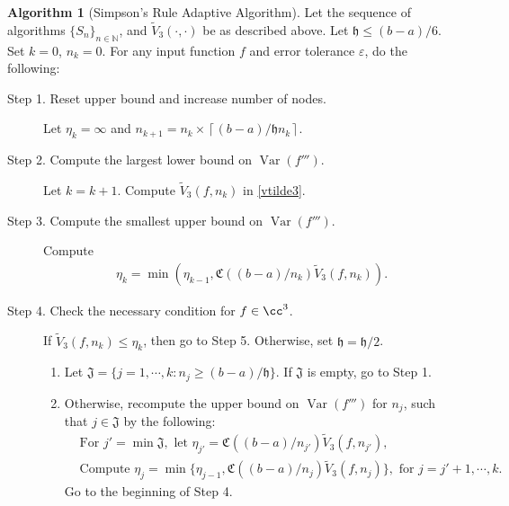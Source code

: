 \documentclass{iitthesis}
\DeclareMathOperator{\Var}{Var}
\theoremstyle{definition}
\newtheorem{algo}{Algorithm}
\theoremstyle{remark}
\begin{document}
\begin{algo} [Simpson's Rule Adaptive Algorithm] \label{multistageintegalgosimpson}
Let the sequence of algorithms $\{S_n\}_{n\in \mathbb{N}}$, %
and $\widetilde{V}_3(\cdot,\cdot)$ be as described above.
Let $\mathfrak{h}\le (b-a)/6$. Set $k=0$, $n_{k}=0$. For any input function $f$ and error tolerance $\varepsilon$, do the following: %
\begin{description}
\item[Step 1. Reset upper bound and increase number of nodes.] Let $\eta_{k}=\infty$ and $n_{k+1}=n_k\times\left\lceil(b-a)/\mathfrak{h}n_{k}\right\rceil$.

\item[Step 2. Compute the largest lower bound on {$\Var(f''')$}.] Let $k=k+1$. Compute  $\widetilde{V}_3(f,n_k)$ in \eqref{vtilde3}.%

\item[Step 3. Compute the smallest upper bound on {$\Var(f''')$}.] Compute
    \begin{align*}
        \eta_{k}=\min\left(\eta_{k-1},\mathfrak{C}((b-a)/n_{k})\widetilde{V}_3(f,n_k)\right).
    \end{align*}

\item[Step 4. Check the necessary condition for $f \in \cc^3$.] If $\widetilde{V}_3(f,n_k) \le \eta_{k}$, then go to Step 5.
  Otherwise, set $\mathfrak{h} = \mathfrak{h}/2$.
    \begin{enumerate}[label=\alph*)]
      \item Let $\mathfrak{J}=\{j=1, \cdots, k: n_{j}\ge (b-a)/\mathfrak{h}\}$. If $\mathfrak{J}$ is empty, go to Step 1.
      \item Otherwise, recompute the upper bound on $\Var(f''')$ for $n_{j}$, such that $j \in \mathfrak{J}$ by the following:
      \begin{align*}
        &\text{For } j'=\min\mathfrak{J}, \text{ let } \eta_{j'}=\mathfrak{C}((b-a)/n_{j'})\widetilde{V}_3(f,n_{j'}), \\
        &\text{Compute } \eta_{j}=\min\{\eta_{j-1},\mathfrak{C}((b-a)/n_{j})\widetilde{V}_3(f,n_{j})\}, \text{ for } j=j'+1, \cdots, k.
      \end{align*}
      Go to the beginning of Step 4.
    \end{enumerate}



\end{description}
\end{algo}
\end{document}
